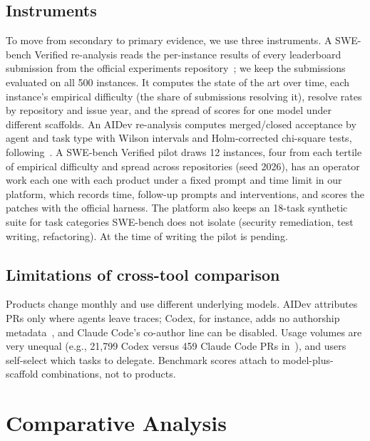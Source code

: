 \documentclass[conference]{IEEEtran}
\providecommand{\pilotstatus}{pending}
\begin{document}
\subsection{Instruments}
To move from secondary to primary evidence, we use three instruments. A SWE-bench Verified
re-analysis reads the per-instance results of every leaderboard submission from the official
experiments repository~\cite{swebench2026experiments}; we keep the \swevSubs{} submissions evaluated on
all 500 instances. It computes the state of the art over time, each instance's empirical difficulty (the
share of submissions resolving it), resolve rates by repository and issue year, and the spread of
scores for one model under different scaffolds. An AIDev re-analysis computes
merged/closed acceptance by agent and task type with Wilson intervals and Holm-corrected chi-square tests,
following~\cite{pinna2026}. A SWE-bench Verified pilot draws 12 instances, four from each tertile of empirical
difficulty and spread across repositories (seed 2026), has an operator work each one with each product under a fixed prompt and time limit in our
platform, which records time, follow-up prompts and interventions, and scores the patches with the
official harness. The platform also keeps an 18-task synthetic suite for task categories SWE-bench
does not isolate (security remediation, test writing, refactoring).
At the time of writing the pilot is \pilotstatus.

\subsection{Limitations of cross-tool comparison}
Products change monthly and use different underlying models. AIDev attributes PRs only where agents leave
traces; Codex, for instance, adds no authorship metadata~\cite{li2025teammates}, and Claude Code's
co-author line can be disabled. Usage volumes are very unequal (e.g., 21,799 Codex versus 459 Claude Code
PRs in~\cite{rahman2026}), and users self-select which tasks to delegate. Benchmark scores attach to
model-plus-scaffold combinations, not to products.

\section{Comparative Analysis}\label{sec:compare}


\end{document}
